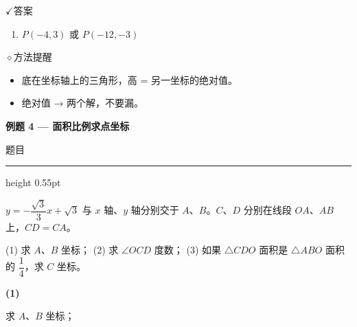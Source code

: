 \documentclass{exam-zh}
\newcommand{\eduSectionTitle}[1]{%
  \needspace{5\baselineskip}%
  \vspace{2mm}
  {\color{edu-blue}\bfseries\large #1}\par
  \vspace{3mm}
}
\newenvironment{eduSubQuestionItem}[1]{%
  \needspace{4\baselineskip}%
  \vspace{2mm}
  \par\noindent
  \hangindent=8mm\hangafter=1
  {\color{edu-blue}\bfseries #1}\enspace
  \begingroup
  \color{edu-ink}
}{%
  \endgroup
  \par
  \vspace{3mm}
}
\newcommand{\eduIconCheck}{\(\checkmark\)}
\newcommand{\eduIconPin}{\(\diamond\)}
\newenvironment{eduProblemBlock}[1][题目]{%
  \needspace{8\baselineskip}
  {\small\color{edu-muted}#1}\par
  \vspace{1.5mm}
  {\color{edu-blue}\hrule height 0.55pt}
  \vspace{4.5mm}
  \begingroup
  \color{edu-ink}
  \large
  \setlength{\parskip}{2.2mm}
  \linespread{1.20}\selectfont
}{%
  \par
  \endgroup
  \vspace{6mm}
}
\newenvironment{eduBulletList}{%
  \begin{itemize}[
    label=\textbullet,
    leftmargin=5mm,
    itemsep=1.2mm,
    topsep=0pt,
    parsep=0pt
  ]
}{%
  \end{itemize}
}
\newenvironment{eduBottomGrid}{%
  \vspace{1mm}
  \par\noindent
}{%
  \par\vspace{1mm}
}
\newenvironment{eduSummaryLeft}{%
  \begin{minipage}[t]{0.30\linewidth}
}{%
  \end{minipage}
}
\newcommand{\eduSummaryDivider}{%
  \hspace{4mm}{\color{edu-line}\vrule width 0.35pt}\hspace{7mm}%
}
\newenvironment{eduSummaryRight}{%
  \begin{minipage}[t]{0.58\linewidth}
}{%
  \end{minipage}
}
\newenvironment{eduPlainList}{%
  \begin{enumerate}[
    label=(\arabic*),
    leftmargin=7mm,
    itemsep=1.2mm,
    topsep=0pt,
    parsep=0pt
  ]
}{%
  \end{enumerate}
}
\begin{document}
\begin{eduBottomGrid}
  \begin{eduSummaryLeft}
    \begin{eduSummaryBlock}{\eduIconCheck}{答案}
    \begin{eduPlainList}
      \item $P(-4, 3)$ 或 $P(-12, -3)$    \end{eduPlainList}
    \end{eduSummaryBlock}
  \end{eduSummaryLeft}
  \eduSummaryDivider
  \begin{eduSummaryRight}
    \begin{eduSummaryBlock}{\eduIconPin}{方法提醒}
    \begin{eduBulletList}
      \item 底在坐标轴上的三角形，高 = 另一坐标的绝对值。      \item 绝对值 → 两个解，不要漏。    \end{eduBulletList}
    \end{eduSummaryBlock}
  \end{eduSummaryRight}
\end{eduBottomGrid}



\eduSectionTitle{例题 4 — 面积比例求点坐标}

\begin{eduProblemBlock}[题目]
$y=-\dfrac{\sqrt{3}}{3}x+\sqrt{3}$ 与 $x$ 轴、$y$ 轴分别交于 $A$、$B$。$C$、$D$ 分别在线段 $OA$、$AB$ 上，$CD=CA$。

(1) 求 $A$、$B$ 坐标；
(2) 求 $\angle OCD$ 度数；
(3) 如果 $\triangle CDO$ 面积是 $\triangle ABO$ 面积的 $\dfrac{1}{4}$，求 $C$ 坐标。
\end{eduProblemBlock}









\begin{eduSubQuestionItem}{(1)}
求 $A$、$B$ 坐标；\end{eduSubQuestionItem}
\end{document}
